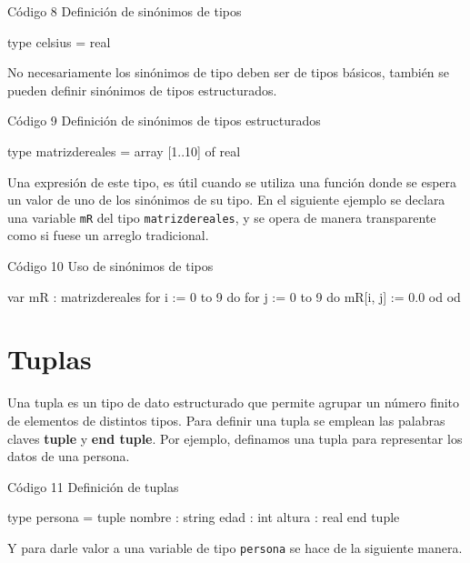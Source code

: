 \begin{codebox}{Código 8}
\footnotesize Definición de sinónimos de tipos
\tcblower
\begin{pascallike}
type celsius = real
\end{pascallike}
\end{codebox}
No necesariamente los sinónimos de tipo deben ser de tipos básicos, también se pueden definir sinónimos de tipos estructurados.

\begin{codebox}{Código 9}
\footnotesize Definición de sinónimos de tipos estructurados
\tcblower
\begin{pascallike}
type matrizdereales = array [1..10] of real
\end{pascallike}
\end{codebox}

Una expresión de este tipo, es útil cuando se utiliza una función donde se espera un valor de uno de los sinónimos de su tipo. En el siguiente ejemplo se declara una variable \texttt{mR} del tipo \texttt{matrizdereales}, y se opera de manera transparente como si fuese un arreglo tradicional.

\begin{codebox}{Código 10}
\footnotesize Uso de sinónimos de tipos
\tcblower
\begin{pascallike}
var mR : matrizdereales
for i := 0 to 9 do
    for j := 0 to 9 do
        mR[i, j] := 0.0
    od
od
\end{pascallike}
\end{codebox}

\section{Tuplas}
Una tupla es un tipo de dato estructurado que permite agrupar un número finito de elementos de distintos tipos. Para definir una tupla se emplean las palabras claves \textbf{tuple} y \textbf{end tuple}. Por ejemplo, definamos una tupla para representar los datos de una persona.

\begin{codebox}{Código 11}
\footnotesize Definición de tuplas
\tcblower
\begin{pascallike}
type persona = tuple
                nombre : string
                edad : int
                altura : real
                end tuple
\end{pascallike}
\end{codebox}
Y para darle valor a una variable de tipo \texttt{persona} se hace de la siguiente manera.

